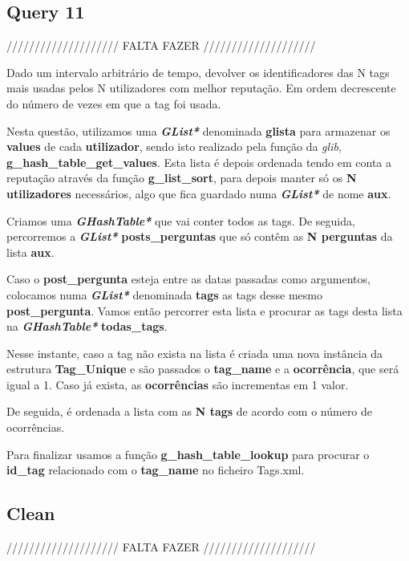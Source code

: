 \documentclass[a4paper]{article}
\begin{document}
\subsection{Query 11}

//////////////////// FALTA FAZER ////////////////////

Dado um intervalo arbitrário de tempo, devolver os identificadores das N tags
mais usadas pelos N utilizadores com melhor reputação. Em ordem decrescente 
do número de vezes em que a tag foi usada.

Nesta questão, utilizamos uma \textit{\textbf{GList*}} denominada 
\textbf{glista} para armazenar os \textbf{values} de cada \textbf{utilizador},
sendo isto realizado pela função da \textit{glib}, 
\textbf{g\_hash\_table\_get\_values}. Esta lista é depois ordenada tendo em
conta a reputação através da função \textbf{g\_list\_sort}, para depois 
manter só os \textbf{N utilizadores} necessários, algo que fica guardado
numa \textit{\textbf{GList*}} de nome \textbf{aux}.

Criamos uma \textit{\textbf{GHashTable*}} que vai conter todos as tags.
De seguida, percorremos a \textit{\textbf{GList*}} \textbf{posts\_perguntas}
que só contêm as \textbf{N perguntas} da lista \textbf{aux}.

Caso o \textbf{post\_pergunta} esteja entre as datas passadas como argumentos,
colocamos numa \textit{\textbf{GList*}} denominada \textbf{tags} as tags desse
mesmo \textbf{post\_pergunta}. Vamos então percorrer esta lista e procurar
as tags desta lista na \textit{\textbf{GHashTable*}} \textbf{todas\_tags}.

Nesse instante, caso a tag não exista na lista é criada uma nova instância
da estrutura \textbf{Tag\_Unique} e são passados o \textbf{tag\_name} e
a \textbf{ocorrência}, que será igual a 1. Caso já exista, as 
\textbf{ocorrências} são incrementas em 1 valor.

De seguida, é ordenada a lista com as \textbf{N tags} de acordo com o
número de ocorrências. 

Para finalizar usamos a função \textbf{g\_hash\_table\_lookup} para procurar
o \textbf{id\_tag} relacionado com o \textbf{tag\_name} no ficheiro Tags.xml.

\subsection{Clean}

//////////////////// FALTA FAZER ////////////////////
\end{document}
